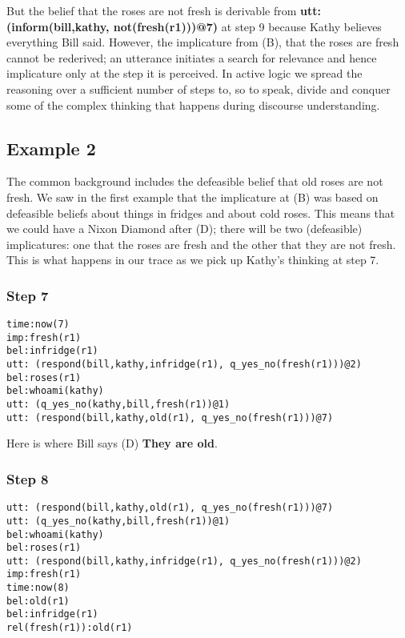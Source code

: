 \documentclass{article}
\begin{document}
But the belief that the roses are not fresh is derivable from {\bf
utt:(inform(bill,kathy, not(fresh(r1)))@7)} at step 9 because Kathy
believes everything Bill said. However, the implicature from (B), that
the roses are fresh cannot be rederived; an utterance initiates a
search for relevance and hence implicature only at the step it is
perceived. In active logic we spread the reasoning over a sufficient
number of steps to, so to speak, divide and conquer some of the
complex thinking that happens during discourse understanding.


\subsection{Example 2}


The common background includes the defeasible belief that old roses
are not fresh. We saw in the first example that the implicature at (B)
was based on defeasible beliefs about things in fridges and about cold
roses.  This means that we could have a Nixon Diamond after (D); there
will be two (defeasible) implicatures: one that the roses are fresh
and the other that they are not fresh. This is what happens in our
trace as we pick up Kathy's thinking at step 7.

\subsubsection{Step 7}

\begin{verbatim}
time:now(7)
imp:fresh(r1)
bel:infridge(r1)
utt: (respond(bill,kathy,infridge(r1), q_yes_no(fresh(r1)))@2)
bel:roses(r1)
bel:whoami(kathy)
utt: (q_yes_no(kathy,bill,fresh(r1))@1)
utt: (respond(bill,kathy,old(r1), q_yes_no(fresh(r1)))@7)
\end{verbatim}

Here is where Bill says (D) {\bf They are old}.

\subsubsection{Step 8}

\begin{verbatim}
utt: (respond(bill,kathy,old(r1), q_yes_no(fresh(r1)))@7)
utt: (q_yes_no(kathy,bill,fresh(r1))@1)
bel:whoami(kathy)
bel:roses(r1)
utt: (respond(bill,kathy,infridge(r1), q_yes_no(fresh(r1)))@2)
imp:fresh(r1)
time:now(8)
bel:old(r1)
bel:infridge(r1)
rel(fresh(r1)):old(r1)
\end{verbatim}
\end{document}
